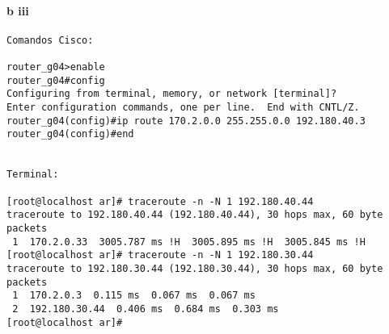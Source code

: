 \paragraph{b iii}
\begin{verbatim}
Comandos Cisco:                                                          
                                                                         
router_g04>enable                                                        
router_g04#config                                                        
Configuring from terminal, memory, or network [terminal]?                
Enter configuration commands, one per line.  End with CNTL/Z.            
router_g04(config)#ip route 170.2.0.0 255.255.0.0 192.180.40.3           
router_g04(config)#end                                                   
                                                                         
                                                                         
Terminal:                                                                
                                                                         
[root@localhost ar]# traceroute -n -N 1 192.180.40.44                    
traceroute to 192.180.40.44 (192.180.40.44), 30 hops max, 60 byte packets
 1  170.2.0.33  3005.787 ms !H  3005.895 ms !H  3005.845 ms !H           
[root@localhost ar]# traceroute -n -N 1 192.180.30.44                    
traceroute to 192.180.30.44 (192.180.30.44), 30 hops max, 60 byte packets
 1  170.2.0.3  0.115 ms  0.067 ms  0.067 ms                              
 2  192.180.30.44  0.406 ms  0.684 ms  0.303 ms                          
[root@localhost ar]#                                                     
\end{verbatim}